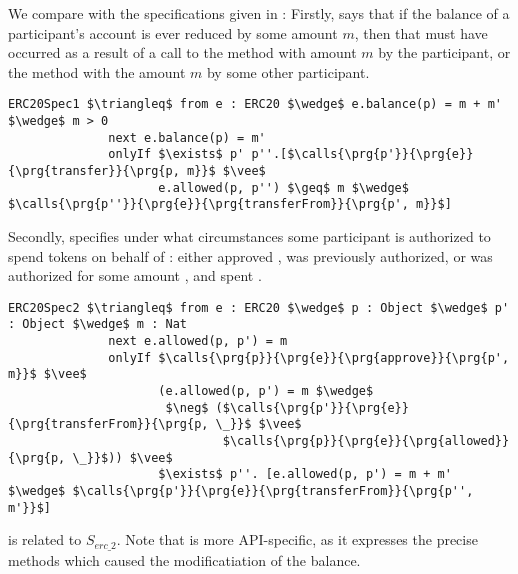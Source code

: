 \vspace{1cm}

We compare with the specifications given in \cite{OOPSLA22}:
 Firstly,  
says that if the balance of a participant's account is ever reduced by some amount $m$, then
that must have occurred as a result of a call to the  method with amount $m$ by the participant,
or the  method with the amount $m$ by some other participant.
\begin{lstlisting}[language = Chainmail, mathescape=true, frame=lines]
ERC20Spec1 $\triangleq$ from e : ERC20 $\wedge$ e.balance(p) = m + m' $\wedge$ m > 0
              next e.balance(p) = m'
              onlyIf $\exists$ p' p''.[$\calls{\prg{p'}}{\prg{e}}{\prg{transfer}}{\prg{p, m}}$ $\vee$ 
                     e.allowed(p, p'') $\geq$ m $\wedge$ $\calls{\prg{p''}}{\prg{e}}{\prg{transferFrom}}{\prg{p', m}}$]
\end{lstlisting}
Secondly,  specifies under what circumstances some participant  is authorized to 
spend  tokens on behalf of : either  approved ,  was previously authorized,
or  was authorized for some amount , and spent .
\begin{lstlisting}[language = Chainmail, mathescape=true, frame=lines]
ERC20Spec2 $\triangleq$ from e : ERC20 $\wedge$ p : Object $\wedge$ p' : Object $\wedge$ m : Nat
              next e.allowed(p, p') = m
              onlyIf $\calls{\prg{p}}{\prg{e}}{\prg{approve}}{\prg{p', m}}$ $\vee$ 
                     (e.allowed(p, p') = m $\wedge$ 
                      $\neg$ ($\calls{\prg{p'}}{\prg{e}}{\prg{transferFrom}}{\prg{p, \_}}$ $\vee$ 
                              $\calls{\prg{p}}{\prg{e}}{\prg{allowed}}{\prg{p, \_}}$)) $\vee$
                     $\exists$ p''. [e.allowed(p, p') = m + m' $\wedge$ $\calls{\prg{p'}}{\prg{e}}{\prg{transferFrom}}{\prg{p'', m'}}$]
\end{lstlisting}

 is related to $S_{erc\_2}$. Note that  is more API-specific, as it expresses the precise methods which caused the modificatiation of the balance.
%
%